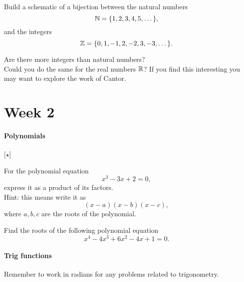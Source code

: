 \begin{problem}[$\dagger\dagger$]
Build a schematic of a bijection between the natural numbers
\begin{equation*}
\mathbb{N}=\{1,2,3,4,5,\dots\},
\end{equation*}
and the integers
\begin{equation*}
\mathbb{Z}=\{0,1,-1,2,-2,3,-3,\dots\}.
\end{equation*}

Are there more integers than natural numbers?\\

Could you do the same for the real numbers $\mathbb{R}$? If you find this interesting you may want to explore the work of Cantor.
\end{problem}




\section{Week 2}
\label{sec: Tutorial sheet 2}

\paragraph{Polynomials}[$\star$]
\begin{problem}
For the polynomial equation
\begin{equation*}
x^{3}-3x+2=0,
\end{equation*}
express it as a product of its factors.\\

Hint: this means write it as 
\begin{equation*}
\left(x-a\right)\left(x-b\right)\left(x-c\right),
\end{equation*}
where $a,b,c$ are the roots of the polynomial.
\end{problem}

\begin{problem}
Find the roots of the following polynomial equation
\begin{equation*}
x^{4}-4x^{3}+6x^{2}-4x+1=0.
\end{equation*}
\end{problem}

\paragraph{Trig functions}
Remember to work in radians for any problems related to trigonometry.

